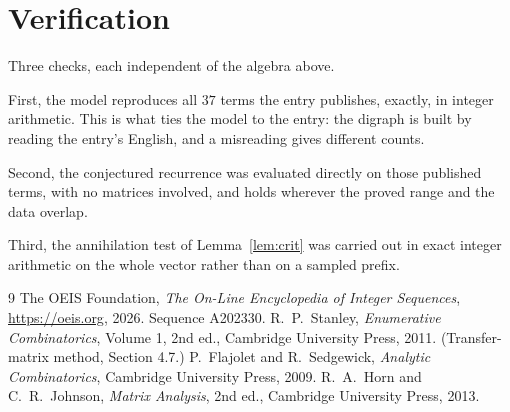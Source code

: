 \documentclass[11pt,a4paper]{article}
\theoremstyle{plain}
\theoremstyle{definition}
\begin{document}
\section{Verification}

Three checks, each independent of the algebra above.

First, the model reproduces all $37$ terms the entry publishes, exactly, in integer
arithmetic. This is what ties the model to the entry: the digraph is built by reading the
entry's English, and a misreading gives different counts.

Second, the conjectured recurrence was evaluated directly on those published terms, with no
matrices involved, and holds wherever the proved range and the data overlap.

Third, the annihilation test of Lemma~\ref{lem:crit} was carried out in exact integer
arithmetic on the whole vector rather than on a sampled prefix.

\begin{thebibliography}{9}
 The OEIS Foundation, \emph{The On-Line Encyclopedia of Integer
Sequences}, \url{https://oeis.org}, 2026. Sequence A202330.
 R.~P.~Stanley, \emph{Enumerative Combinatorics}, Volume 1, 2nd ed.,
Cambridge University Press, 2011. (Transfer-matrix method, Section 4.7.)
 P.~Flajolet and R.~Sedgewick, \emph{Analytic Combinatorics}, Cambridge
University Press, 2009.
 R.~A.~Horn and C.~R.~Johnson, \emph{Matrix Analysis}, 2nd ed., Cambridge
University Press, 2013.
\end{thebibliography}
\end{document}
